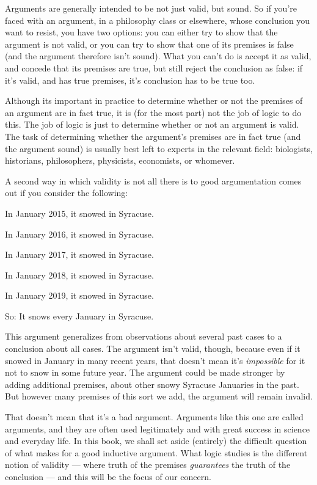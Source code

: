 
Arguments are generally intended to be not just valid, but sound.  So if you're faced with an argument, in a philosophy class or elsewhere, whose conclusion you want to resist, you have two options: you can either try to show that the argument is not valid, or you can try to show that one of its premises is false (and the argument therefore isn't sound).  What you can't do is accept it as valid, and concede that its premises are true, but still reject the conclusion as false: if it's valid, and has true premises, it's conclusion has to be true too.

Although its important in practice to determine whether or not the premises of an argument are in fact true, it is (for the most part) not the job of logic to do this.  The job of logic is just to determine whether or not an argument is valid.  The task of determining whether the argument's premises are in fact true (and the argument sound) is usually best left to experts in the relevant field: biologists,  historians, philosophers, physicists, economists, or whomever.

A second way in which validity is not all there is to good argumentation comes out if you consider the following:
	\begin{earg}
		\item[] In January 2015, it snowed in Syracuse.
		\item[] In January 2016, it snowed in Syracuse.
		\item[] In January 2017, it snowed in Syracuse.
		\item[] In January 2018, it snowed in Syracuse.
		\item[] In January 2019, it snowed in Syracuse.
	\item[So:] It snows every January in Syracuse.
\end{earg}

This argument generalizes from observations about several past cases to a conclusion about all cases. The argument isn't valid, though, because even if it snowed in January in many recent years, that doesn't mean it's \emph{impossible} for it not to snow in some future year.  The argument could be made stronger by adding additional premises, about other snowy Syracuse Januaries in the past. But however many premises of this sort we add, the argument will remain invalid.

That doesn't mean that it's a bad argument.  Arguments like this one are called  arguments, and they are often used legitimately and with great success in science and everyday life.  In this book, we shall set aside (entirely) the difficult question of what makes for a good inductive argument.  What logic studies is the different notion of  validity --- where truth of the premises \emph{guarantees} the truth of the conclusion --- and this will be the focus of our concern.

